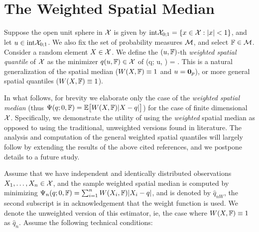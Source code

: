 \section{The Weighted Spatial Median}
\label{Sec:WSQuantiles}

Suppose the open unit sphere in $\mathcal{X}$ is given by 
$\textrm{int} {\mathcal{X}}_{0; 1} = \{ x \in \mathcal{X}: | x | < 1 \}$, and let
 $u \in \textrm{int} {\mathcal{X}}_{0; 1}$. We also fix the set of probability measures $\mathcal{M}$, 
 and select ${\mathbb{F}} \in \mathcal{M}$. Consider a random element $X \in \mathcal{X}$. 
We define the $(u, {\mathbb{F}})$-th \textit{weighted spatial quantile} of $\mathcal{X}$ 
as the minimizer $q (u, {\mathbb{F}}) \in \mathcal{X}$ of 
\baq
\Psi (q; u, \BF) = \BE {}.
\label{eq:WeightedQuantile}
\eaq
%
\noindent
This is a natural generalization of the spatial median \cite{ref:JASA96862_Chaudhuri, ref:Biometrika48414_Haldane,ref:AoS97435_Koltchinskii} ($W(X, {\mathbb{F}}) \equiv 1$ and $u = {\bf 0}_p$), or more general spatial quantiles \cite{ref:AoS17591_Cardotetal_Median_HilbertSpace, ref:AoS141203_ChakrabortyChaudhuri_Banach_Quantile, ref:Bernoulli152308_Minsker_Median_Banach} ($W(X, {\mathbb{F}}) \equiv 1$). 

In what follows, for brevity we elaborate only the case of the \textit{weighted spatial median} (thus $\Psi (q; 0, {\mathbb{F}}) = {\mathbb{E}} \bigl[ W (X, {\mathbb{F}}) | X - q | \bigr] $) for the case of finite dimensional $\mathcal{X}$. Specifically, we demonstrate the utility of using the {\it weighted} spatial median as opposed to using the traditional, unweighted versions found in literature. The analysis and computation of the general weighted spatial quantiles will largely follow by extending the results of the above cited references, and we postpone details to a future study.

Assume that we have independent and identically distributed observations $X_{1}, \ldots, X_{n} \in \mathcal{X}$, and the sample weighted spatial median is computed by minimizing $\Psi_{n} (q; 0, {\mathbb{F}}) = \sum_{i = 1}^{n} W (X_{i}, {\mathbb{F}}) | X_{i} - q | $, and is denoted by $\hat{q}_{nW}$, the second subscript is in acknowledgement that the weight function is used. We denote the unweighted version of this estimator, ie, the case where $W (X, {\mathbb{F}}) \equiv 1$ as $\hat{q}_{n}$. Assume the following technical conditions:

